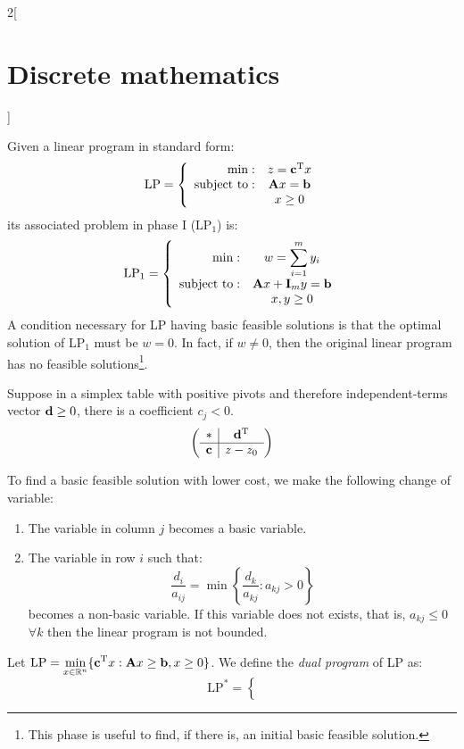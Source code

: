\documentclass[../../../main.tex]{subfiles}
\begin{document}
\begin{multicols}{2}[\section{Discrete mathematics}]
  \begin{definition}
    Given a linear program in standard form:
    $$\text{LP}=\left\{
      \begin{array}{rc}
        \min:              & z=\vb{c}^{\mathrm{T}}x \\
        \text{subject to}: & \boldsymbol{\mathrm{A}}x=\boldsymbol{\mathrm{b}}   \\
                           & x\geq 0
      \end{array}\right.$$ its associated problem in phase I ($\text{LP}_1$) is: $$\text{LP}_1=\left\{\begin{array}{rc}
        \min:              & \displaystyle w=\sum_{i=1}^my_i \\
        \text{subject to}: & \boldsymbol{\mathrm{A}}x+\boldsymbol{\mathrm{I}}_my=\boldsymbol{\mathrm{b}}        \\
                           & x,y\geq 0
      \end{array}\right.$$
    A condition necessary for LP having basic feasible solutions is that the optimal solution of $\text{LP}_1$ must be $w=0$. In fact, if $w\ne 0$, then the original linear program has no feasible solutions\footnote{This phase is useful to find, if there is, an initial basic feasible solution.}.
  \end{definition}
  \begin{prop}
    Suppose in a simplex table with positive pivots and therefore independent-terms vector $\boldsymbol{\mathrm{d}}\geq 0$, there is a coefficient $c_j<0$. $$\left(\begin{array}{c|c}
          *      & \vb{d}^{\mathrm{T}} \\
          \hline
          \boldsymbol{\mathrm{c}} & z-z_0
        \end{array}\right)$$
  \end{prop}
  To find a basic feasible solution with lower cost, we make the following change of variable:
  \begin{enumerate}
    \item The variable in column $j$ becomes a basic variable.
    \item The variable in row $i$ such that: $$\frac{d_i}{a_{ij}}=\min\left\{\frac{d_k}{a_{kj}}:a_{kj}>0\right\}$$ becomes a non-basic variable. If this variable does not exists, that is, $a_{kj}\leq0$ $\forall k$ then the linear program is not bounded.
  \end{enumerate}
  \begin{definition}
    Let $\text{LP}=\displaystyle\min_{x\in\mathbb{R} ^n}\{\vb{c}^{\mathrm{T}}x:\boldsymbol{\mathrm{A}}x\geq \boldsymbol{\mathrm{b}},x\geq 0\}$. We define the \emph{dual program} of LP as: $$\text{LP}^*=\left\{
$$
\end{definition}
\end{multicols}
\end{document}
